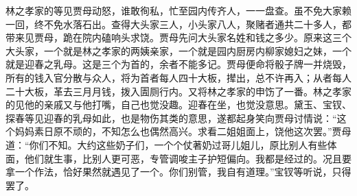 \begin{parag}


    林之孝家的等见贾母动怒，谁敢徇私，忙至园内传齐人，一一盘查。虽不免大家赖一回，终不免水落石出。查得大头家三人，小头家八人，聚赌者通共二十多人，都带来见贾母，跪在院内磕响头求饶。贾母先问大头家名姓和钱之多少。原来这三个大头家，一个就是林之孝家的两姨亲家，一个就是园内厨房内柳家媳妇之妹，一个就是迎春之乳母。这是三个为首的，余者不能多记。贾母便命将骰子牌一并烧毁，所有的钱入官分散与众人，将为首者每人四十大板，撵出，总不许再入；从者每人二十大板，革去三月月钱，拨入圊厕行内。又将林之孝家的申饬了一番。林之孝家的见他的亲戚又与他打嘴，自己也觉没趣。迎春在坐，也觉没意思。黛玉、宝钗、探春等见迎春的乳母如此，也是物伤其类的意思，遂都起身笑向贾母讨情说：“这个妈妈素日原不顽的，不知怎么也偶然高兴。求看二姐姐面上，饶他这次罢。”贾母道：“你们不知。大约这些奶子们，一个个仗著奶过哥儿姐儿，原比别人有些体面，他们就生事，比别人更可恶，专管调唆主子护短偏向。我都是经过的。况且要拿一个作法，恰好果然就遇见了一个。你们别管，我自有道理。”宝钗等听说，只得罢了。
\end{parag}


